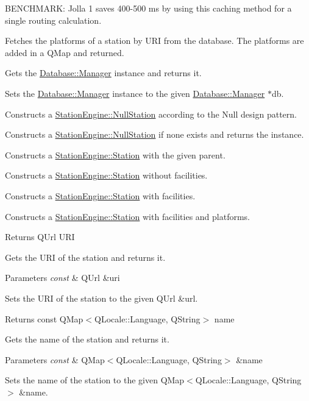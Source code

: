 B\+E\+N\+C\+H\+M\+A\+RK\+: Jolla 1 saves 400-\/500 ms by using this caching method for a single routing calculation.

Fetches the platforms of a station by U\+RI from the database. The platforms are added in a Q\+Map and returned.

Gets the \mbox{\hyperlink{classDatabase_1_1Manager}{Database\+::\+Manager}} instance and returns it.

Sets the \mbox{\hyperlink{classDatabase_1_1Manager}{Database\+::\+Manager}} instance to the given \mbox{\hyperlink{classDatabase_1_1Manager}{Database\+::\+Manager}} $\ast$db.

Constructs a \mbox{\hyperlink{classStationEngine_1_1NullStation}{Station\+Engine\+::\+Null\+Station}} according to the Null design pattern.

Constructs a \mbox{\hyperlink{classStationEngine_1_1NullStation}{Station\+Engine\+::\+Null\+Station}} if none exists and returns the instance.

Constructs a \mbox{\hyperlink{classStationEngine_1_1Station}{Station\+Engine\+::\+Station}} with the given parent.

Constructs a \mbox{\hyperlink{classStationEngine_1_1Station}{Station\+Engine\+::\+Station}} without facilities.

Constructs a \mbox{\hyperlink{classStationEngine_1_1Station}{Station\+Engine\+::\+Station}} with facilities.

Constructs a \mbox{\hyperlink{classStationEngine_1_1Station}{Station\+Engine\+::\+Station}} with facilities and platforms.

\begin{DoxyReturn}{Returns}
Q\+Url U\+RI
\end{DoxyReturn}
Gets the U\+RI of the station and returns it.


\begin{DoxyParams}{Parameters}
{\em const} & Q\+Url \&uri\\
\hline
\end{DoxyParams}
Sets the U\+RI of the station to the given Q\+Url \&url.

\begin{DoxyReturn}{Returns}
const Q\+Map$<$\+Q\+Locale\+::\+Language, Q\+String$>$ name
\end{DoxyReturn}
Gets the name of the station and returns it.


\begin{DoxyParams}{Parameters}
{\em const} & Q\+Map$<$\+Q\+Locale\+::\+Language, Q\+String$>$ \&name\\
\hline
\end{DoxyParams}
Sets the name of the station to the given Q\+Map$<$\+Q\+Locale\+::\+Language, Q\+String$>$ \&name.

